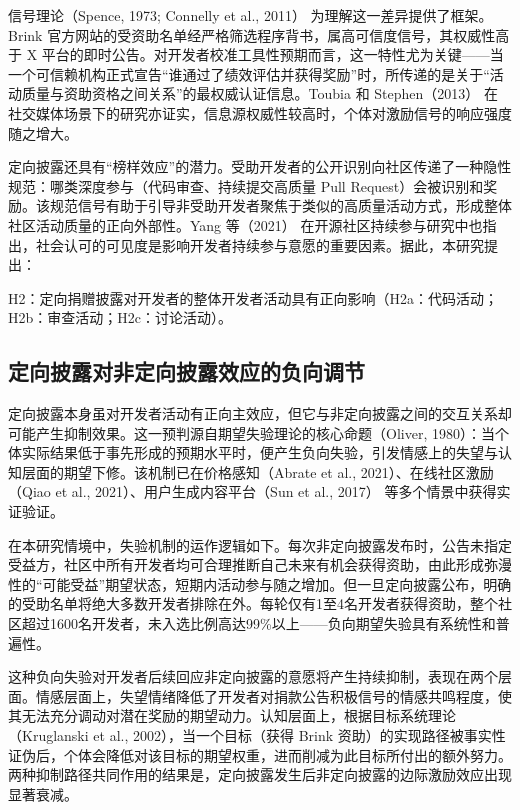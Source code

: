 信号理论（Spence, 1973; Connelly et al., 2011）\cite{spence1973job,connelly2011signaling} 为理解这一差异提供了框架。Brink 官方网站的受资助名单经严格筛选程序背书，属高可信度信号，其权威性高于 X 平台的即时公告。对开发者校准工具性预期而言，这一特性尤为关键——当一个可信赖机构正式宣告“谁通过了绩效评估并获得奖励”时，所传递的是关于“活动质量与资助资格之间关系”的最权威认证信息。Toubia 和 Stephen（2013）\cite{toubia2013intrinsic} 在社交媒体场景下的研究亦证实，信息源权威性较高时，个体对激励信号的响应强度随之增大。

定向披露还具有“榜样效应”的潜力。受助开发者的公开识别向社区传递了一种隐性规范：哪类深度参与（代码审查、持续提交高质量 Pull Request）会被识别和奖励。该规范信号有助于引导非受助开发者聚焦于类似的高质量活动方式，形成整体社区活动质量的正向外部性。Yang 等（2021）\cite{yang2021differential} 在开源社区持续参与研究中也指出，社会认可的可见度是影响开发者持续参与意愿的重要因素。据此，本研究提出：

H2：定向捐赠披露对开发者的整体开发者活动具有正向影响（H2a：代码活动；H2b：审查活动；H2c：讨论活动）。

\subsection{定向披露对非定向披露效应的负向调节}

定向披露本身虽对开发者活动有正向主效应，但它与非定向披露之间的交互关系却可能产生抑制效果。这一预判源自期望失验理论的核心命题（Oliver, 1980）\cite{oliver1980cognitive}：当个体实际结果低于事先形成的预期水平时，便产生负向失验，引发情感上的失望与认知层面的期望下修。该机制已在价格感知（Abrate et al., 2021）\cite{abrate2021relationship}、在线社区激励（Qiao et al., 2021）\cite{qiao2021mitigating}、用户生成内容平台（Sun et al., 2017）\cite{sun2017motivation} 等多个情景中获得实证验证。

在本研究情境中，失验机制的运作逻辑如下。每次非定向披露发布时，公告未指定受益方，社区中所有开发者均可合理推断自己未来有机会获得资助，由此形成弥漫性的“可能受益”期望状态，短期内活动参与随之增加。但一旦定向披露公布，明确的受助名单将绝大多数开发者排除在外。每轮仅有1至4名开发者获得资助，整个社区超过1600名开发者，未入选比例高达99\%以上——负向期望失验具有系统性和普遍性。

这种负向失验对开发者后续回应非定向披露的意愿将产生持续抑制，表现在两个层面。情感层面上，失望情绪降低了开发者对捐款公告积极信号的情感共鸣程度，使其无法充分调动对潜在奖励的期望动力。认知层面上，根据目标系统理论（Kruglanski et al., 2002）\cite{kruglanski2002theory}，当一个目标（获得 Brink 资助）的实现路径被事实性证伪后，个体会降低对该目标的期望权重，进而削减为此目标所付出的额外努力。两种抑制路径共同作用的结果是，定向披露发生后非定向披露的边际激励效应出现显著衰减。

